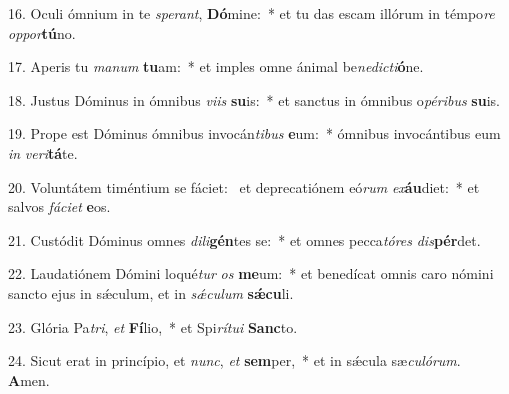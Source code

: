 16. Oculi ómnium in te \textit{spe}\textit{rant}, \textbf{Dó}mine:~*  et tu das escam illórum in témpo\textit{re} \textit{op}\textit{por}\textbf{tú}no.\

17. Aperis tu \textit{ma}\textit{num} \textbf{tu}am:~*  et imples omne ánimal be\textit{ne}\textit{dic}\textit{ti}\textbf{ó}ne.\

18. Justus Dóminus in ómnibus \textit{vi}\textit{is} \textbf{su}is:~*  et sanctus in ómnibus o\textit{pé}\textit{ri}\textit{bus} \textbf{su}is.\

19. Prope est Dóminus ómnibus invocán\textit{ti}\textit{bus} \textbf{e}um:~*  ómnibus invocántibus eum \textit{in} \textit{ve}\textit{ri}\textbf{tá}te.\

20. Voluntátem timéntium se fáciet: \dag\  et deprecatiónem eó\textit{rum} \textit{ex}\textbf{áu}diet:~*  et salvos \textit{fá}\textit{ci}\textit{et} \textbf{e}os.\

21. Custódit Dóminus omnes \textit{di}\textit{li}\textbf{gén}tes se:~*  et omnes pecca\textit{tó}\textit{res} \textit{dis}\textbf{pér}det.\

22. Laudatiónem Dómini loqué\textit{tur} \textit{os} \textbf{me}um:~*  et benedícat omnis caro nómini sancto ejus in sǽculum, et in \textit{sǽ}\textit{cu}\textit{lum} \textbf{sǽ}\textbf{cu}li.\

23. Glória Pa\textit{tri}, \textit{et} \textbf{Fí}lio,~*  et Spi\textit{rí}\textit{tu}\textit{i} \textbf{Sanc}to.\

24. Sicut erat in princípio, et \textit{nunc}, \textit{et} \textbf{sem}per,~*  et in sǽcula sæ\textit{cu}\textit{ló}\textit{rum}. \textbf{A}men.\

